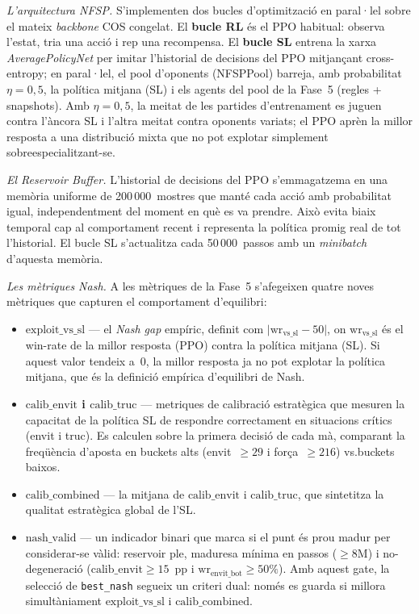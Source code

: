 \emph{L'arquitectura NFSP.} S'implementen dos bucles d'optimització en paral·lel sobre
el mateix \emph{backbone} COS congelat. El \textbf{bucle RL} és el PPO habitual: observa
l'estat, tria una acció i rep una recompensa. El \textbf{bucle \ac{SL}} entrena la xarxa
\emph{AveragePolicyNet} per imitar l'historial de decisions del PPO mitjançant
cross-entropy; en paral·lel, el pool d'oponents (NFSPPool) barreja, amb probabilitat
\(\eta = 0{,}5\), la política mitjana (SL) i els agents del pool de la Fase~5 (regles +
snapshots). Amb \(\eta = 0{,}5\), la meitat de les partides d'entrenament es juguen
contra l'àncora SL i l'altra meitat contra oponents variats; el PPO aprèn la millor
resposta a una distribució mixta que no pot explotar simplement sobreespecialitzant-se.

\emph{El Reservoir Buffer.} L'historial de decisions del PPO s'emmagatzema en una
memòria uniforme de 200\,000~mostres que manté cada acció amb probabilitat igual,
independentment del moment en què es va prendre. Això evita biaix temporal cap al
comportament recent i representa la política promig real de tot l'historial. El bucle
\ac{SL} s'actualitza cada 50\,000~passos amb un \emph{minibatch} d'aquesta memòria.

\emph{Les mètriques Nash.} A les mètriques de la Fase~5 s'afegeixen quatre noves
mètriques que capturen el comportament d'equilibri:
\begin{itemize}
  \item \textbf{\(\text{exploit\_vs\_sl}\)} — el \emph{Nash gap} empíric, definit com
        \(\lvert \text{wr}_{\text{vs\_sl}} - 50 \rvert\), on \(\text{wr}_{\text{vs\_sl}}\)
        és el win-rate de la millor resposta (PPO) contra la política mitjana (SL). Si
        aquest valor tendeix a~0, la millor resposta ja no pot explotar la política
        mitjana, que és la definició empírica d'equilibri de Nash.
  \item \textbf{\(\text{calib\_envit}\) i \(\text{calib\_truc}\)} — metriques de
        calibració estratègica que mesuren la capacitat de la política \ac{SL} de
        respondre correctament en situacions crítics (envit i truc). Es calculen sobre
        la primera decisió de cada mà, comparant la freqüència d'aposta en buckets
        alts (envit~$\geq 29$ i força~$\geq 216$) vs.\@ buckets baixos.
  \item \textbf{\(\text{calib\_combined}\)} — la mitjana de \(\text{calib\_envit}\) i
        \(\text{calib\_truc}\), que sintetitza la qualitat estratègica global de
        l'\ac{SL}.
  \item \textbf{\(\text{nash\_valid}\)} — un indicador binari que marca si el punt és
        prou madur per considerar-se vàlid: reservoir ple, maduresa mínima en passos
        (\(\geq 8\)M) i no-degeneració (\(\text{calib\_envit}\geq 15\)~pp i
        \(\text{wr}_{\text{envit\_bot}}\geq 50\%\)). Amb aquest gate, la selecció de
        \texttt{best\_nash} segueix un criteri dual: només es guarda si millora
        simultàniament \(\text{exploit\_vs\_sl}\) i \(\text{calib\_combined}\).
\end{itemize}


